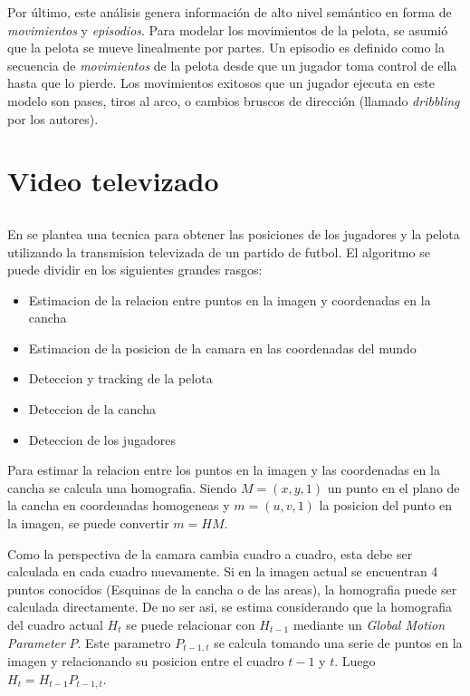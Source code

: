 \documentclass[a4paper,10pt]{article}
\begin{document}
Por último, este análisis genera información de alto nivel semántico en forma de \textit{movimientos}
y \textit{episodios}. Para modelar los movimientos de la pelota, se asumió que la pelota se mueve linealmente por partes.
Un episodio es definido como la secuencia de \textit{movimientos} de la pelota desde que un jugador toma control
de ella hasta que lo pierde. Los movimientos exitosos que un jugador ejecuta en este modelo son pases, tiros al arco,
o cambios bruscos de dirección (llamado \textit{dribbling} por los autores).

\section{Video televizado}

\subsection{}

En \cite{Liu20061146} se plantea una tecnica para obtener las posiciones de los jugadores y la pelota utilizando la transmision televizada de un partido de futbol.
El algoritmo se puede dividir en los siguientes grandes rasgos:
\begin{itemize}
\item Estimacion de la relacion entre puntos en la imagen y coordenadas en la cancha
\item Estimacion de la posicion de la camara en las coordenadas del mundo
\item Deteccion y tracking de la pelota
\item Deteccion de la cancha
\item Deteccion de los jugadores
\end{itemize}

Para estimar la relacion entre los puntos en la imagen y las coordenadas en la cancha se calcula una homografia.
Siendo $M = (x, y, 1)$ un punto en el plano de la cancha en coordenadas homogeneas y $m = (u, v, 1)$ la posicion del punto en la imagen, se puede convertir $ m = H M $.

Como la perspectiva de la camara cambia cuadro a cuadro, esta debe ser calculada en cada cuadro nuevamente.
Si en la imagen actual se encuentran 4 puntos conocidos (Esquinas de la cancha o de las areas), la homografia puede ser calculada directamente.
De no ser asi, se estima considerando que la homografia del cuadro actual $H_t$ se puede relacionar con $H_{t-1}$ mediante un \textit{Global Motion Parameter} $P$.
Este parametro $P_{t-1,t}$ se calcula tomando una serie de puntos en la imagen y relacionando su posicion entre el cuadro $t-1$ y $t$.
Luego $ H_t = H_{t-1} P_{t-1,t}$.
\end{document}
